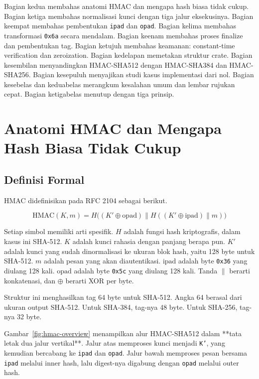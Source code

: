 \documentclass[11pt,a4paper]{article}
\begin{document}
Bagian kedua membahas anatomi HMAC dan mengapa hash biasa tidak cukup. Bagian ketiga membahas normalisasi kunci dengan tiga jalur eksekusinya. Bagian keempat membahas pembentukan \texttt{ipad} dan \texttt{opad}. Bagian kelima membahas transformasi \texttt{0x6a} secara mendalam. Bagian keenam membahas proses finalize dan pembentukan tag. Bagian ketujuh membahas keamanan: constant-time verification dan zeroization. Bagian kedelapan memetakan struktur crate. Bagian kesembilan menyandingkan HMAC-SHA512 dengan HMAC-SHA384 dan HMAC-SHA256. Bagian kesepuluh menyajikan studi kasus implementasi dari nol. Bagian kesebelas dan keduabelas merangkum kesalahan umum dan lembar rujukan cepat. Bagian ketigabelas menutup dengan tiga prinsip.

\section{Anatomi HMAC dan Mengapa Hash Biasa Tidak Cukup}

\subsection{Definisi Formal}

HMAC didefinisikan pada RFC 2104 \cite{rfc2104} sebagai berikut.

\[
	\text{HMAC}(K, m) = H\big( (K' \oplus \text{opad}) \parallel H((K' \oplus \text{ipad}) \parallel m) \big)
\]

Setiap simbol memiliki arti spesifik. $H$ adalah fungsi hash kriptografis, dalam kasus ini SHA-512. $K$ adalah kunci rahasia dengan panjang berapa pun. $K'$ adalah kunci yang sudah dinormalisasi ke ukuran blok hash, yaitu 128 byte untuk SHA-512. $m$ adalah pesan yang akan diautentikasi. $\text{ipad}$ adalah byte \texttt{0x36} yang diulang 128 kali. $\text{opad}$ adalah byte \texttt{0x5c} yang diulang 128 kali. Tanda $\parallel$ berarti konkatenasi, dan $\oplus$ berarti XOR per byte.

Struktur ini menghasilkan tag 64 byte untuk SHA-512. Angka 64 berasal dari ukuran output SHA-512. Untuk SHA-384, tag-nya 48 byte. Untuk SHA-256, tag-nya 32 byte.

Gambar~\ref{fig:hmac-overview} menampilkan alur HMAC-SHA512 dalam **tata letak dua jalur vertikal**. Jalur atas memproses kunci menjadi \texttt{K'}, yang kemudian bercabang ke \texttt{ipad} dan \texttt{opad}. Jalur bawah memproses pesan bersama \texttt{ipad} melalui inner hash, lalu digest-nya digabung dengan \texttt{opad} melalui outer hash.
\end{document}
